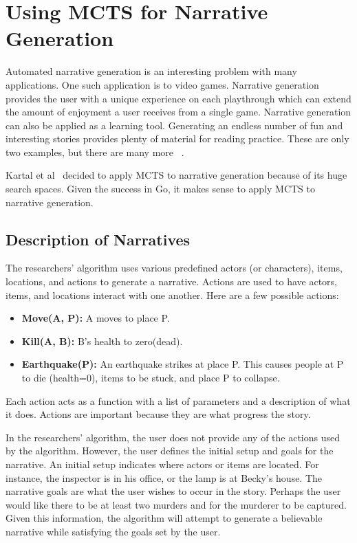 \documentclass{sig-alternate}
\begin{document}
\section{Using MCTS for Narrative Generation}
Automated narrative generation is an interesting problem with many applications. One such application is to video games. Narrative generation provides the user with a unique experience on each playthrough which can extend the amount of enjoyment a user receives from a single game. Narrative generation can also be applied as a learning tool. Generating an endless number of fun and interesting stories provides plenty of material for reading practice. These are only two examples, but there are many more ~\cite{Narrative}.

Kartal et al~\cite{Narrative} decided to apply MCTS to narrative generation because of its huge search spaces. Given the success in Go, it makes sense to apply MCTS to narrative generation.

\subsection{Description of Narratives}
The researchers' algorithm uses various predefined actors (or characters), items, locations, and actions to generate a narrative. Actions are used to have actors, items, and locations interact with one another. Here are a few possible actions:
\begin{itemize}
\item \textbf{Move(A, P):} A moves to place P.
\item \textbf{Kill(A, B):} B's health to zero(dead).
\item \textbf{Earthquake(P):} An earthquake strikes at place P. This causes people at P to die (health=0), items to be stuck, and place P to collapse.
\end{itemize}
Each action acts as a function with a list of parameters and a description of what it does. Actions are important because they are what progress the story. 

In the researchers' algorithm, the user does not provide any of the actions used by the algorithm. However, the user defines the initial setup and goals for the narrative. An initial setup indicates where actors or items are located. For instance, the inspector is in his office, or the lamp is at Becky's house. The narrative goals are what the user wishes to occur in the story. Perhaps the user would like there to be at least two murders and for the murderer to be captured. Given this information, the algorithm will attempt to generate a believable narrative while satisfying the goals set by the user.
\end{document}
